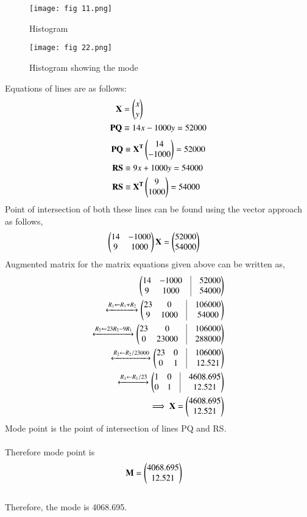\documentclass[journal,12pt,twocolumn]{IEEEtran}
\begin{document}
\begin{figure}[ht]
    \centering
    \texttt{[image: fig 11.png]}
    \caption{Histogram}
    \label{Fig 1.1}
\end{figure}
\begin{figure}[ht]
    \centering
    \texttt{[image: fig 22.png]}
    \caption{Histogram showing the mode}
    \label{}
\end{figure}
Equations of lines are as follows:\\
\begin{align}
\mathbf{X} &= \begin{pmatrix}x \\ y\end{pmatrix}\\
    \mathbf{PQ} &\equiv 14x - 1000y =  52000 
\end{align}    
\begin{align}    
    \mathbf{PQ} &\equiv \mathbf{X^T}\begin{pmatrix}14 \\ -1000\end{pmatrix} = 52000\\
    \mathbf{RS} &\equiv 9x + 1000y =  54000 \\     
    \mathbf{RS} &\equiv \mathbf{X^T}\begin{pmatrix}9 \\ 1000\end{pmatrix} = 54000
\end{align}
Point of intersection of both these lines can be found using the vector approach as follows,\\
\begin{align}
\begin{pmatrix}14 & -1000 \\
		9 & 1000\end{pmatrix}\mathbf{X} &= \begin{pmatrix}52000 \\ 54000\end{pmatrix}
\end{align}	
Augmented matrix for the matrix equations given above can be written as,\\
\begin{align}
	\myvec{ 14 & -1000 & \vrule & 52000 \\
		9 & 1000 & \vrule & 54000} \\
	\xleftrightarrow[]{R_1 \leftarrow R_1+R_2}
		\myvec{ 23 & 0 & \vrule & 106000 \\
			9 & 1000 & \vrule & 54000} \\
	\xleftrightarrow[]{R_2 \leftarrow 23R_2-9R_1}
		\myvec{ 23 & 0 & \vrule & 106000 \\
			0 & 23000 &\vrule & 288000} \\
	\xleftrightarrow[]{R_2 \leftarrow R_2/23000}
		\myvec{ 23 & 0 & \vrule & 106000 \\
			0 & 1 & \vrule & 12.521} \\
	\xleftrightarrow[]{ R_1 \leftarrow R_1/23}
		\myvec{ 1 & 0 & \vrule & 4608.695 \\
			0 & 1 & \vrule & 12.521} \\
	\implies \vec{X} = \myvec{4608.695 \\ 12.521}
\end{align}
Mode point is the point of intersection of lines PQ and RS.\\\\
Therefore mode point is\\
\begin{align}
	\mathbf{M} &= \begin{pmatrix}4068.695 \\ 12.521\end{pmatrix}
\end{align}\\
Therefore, the mode is 4068.695.\\
\end{document}
